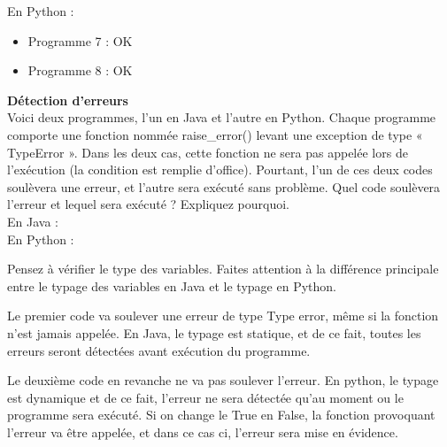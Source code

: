 \begin{Exercice}[15 minutes]
\begin{solution}
        En Python : \\
        
        \begin{itemize}
        	\item Programme 7 : OK
        	\item Programme 8 : OK
        \end{itemize}
        
        
    \end{solution}
\end{Exercice}

\begin{Exercice}[15 minutes] \textbf{Détection d'erreurs} \\

    Voici deux programmes, l’un en Java et l’autre en Python. Chaque programme comporte une fonction nommée raise\_error() levant une exception de type « TypeError ». Dans les deux cas, cette fonction ne sera pas appelée lors de l'exécution (la condition est remplie d’office). Pourtant, l’un de ces deux codes soulèvera une erreur, et l’autre sera exécuté sans problème. Quel code soulèvera l’erreur et lequel sera exécuté ? Expliquez pourquoi.\\
    
    En Java : \\
    
    
    
    En Python : \\
    
      
    
    
    \begin{conseil}
        Pensez à vérifier le type des variables. Faites attention à la différence principale entre le typage des variables en Java et le typage en Python.\\
    \end{conseil}
    \begin{solution}
    	Le premier code va soulever une erreur de type Type error, même si la fonction n'est jamais appelée. En Java, le typage est statique, et de ce fait, toutes les erreurs seront détectées avant exécution du programme.

Le deuxième code en revanche ne va pas soulever l'erreur. En python, le typage est dynamique et de ce fait, l'erreur ne sera détectée qu'au moment ou le programme sera exécuté. Si on change le True en False, la fonction provoquant l'erreur va être appelée, et dans ce cas ci, l'erreur sera mise en évidence.\\
    \end{solution}

\end{Exercice}
\newpage

